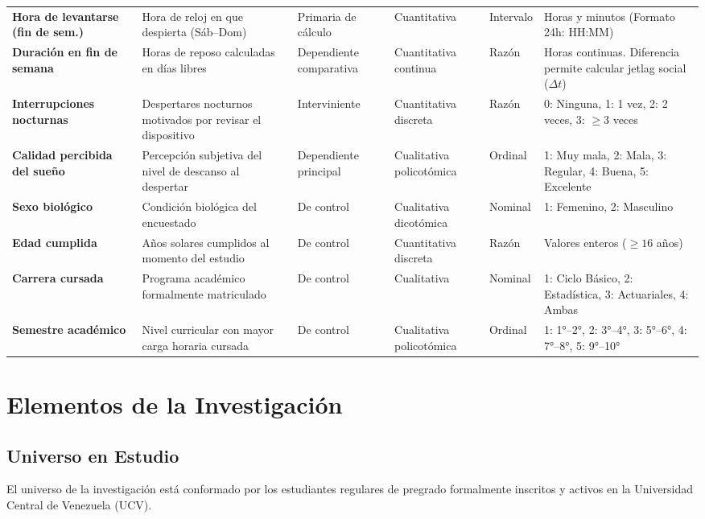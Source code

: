 \documentclass[12pt, letterpaper]{article}
\begin{document}
\begin{table}[H]
\begin{tabularx}{\textwidth}{p{2.8cm}p{3.8cm}lllX}
        \addlinespace
        \textbf{Hora de levantarse (fin de sem.)} & Hora de reloj en que despierta (Sáb--Dom) & Primaria de cálculo & Cuantitativa & Intervalo & Horas y minutos (Formato 24h: HH:MM) \\
        \addlinespace
        \textbf{Duración en fin de semana} & Horas de reposo calculadas en días libres & Dependiente comparativa & Cuantitativa continua & Razón & Horas continuas. Diferencia permite calcular jetlag social ($\Delta t$) \\
        \addlinespace
        \textbf{Interrupciones nocturnas} & Despertares nocturnos motivados por revisar el dispositivo & Interviniente & Cuantitativa discreta & Razón & 0: Ninguna, 1: 1 vez, 2: 2 veces, 3: $\ge 3$ veces \\
        \addlinespace
        \textbf{Calidad percibida del sueño} & Percepción subjetiva del nivel de descanso al despertar & Dependiente principal & Cualitativa policotómica & Ordinal & 1: Muy mala, 2: Mala, 3: Regular, 4: Buena, 5: Excelente \\
        \addlinespace
        \textbf{Sexo biológico} & Condición biológica del encuestado & De control & Cualitativa dicotómica & Nominal & 1: Femenino, 2: Masculino \\
        \addlinespace
        \textbf{Edad cumplida} & Años solares cumplidos al momento del estudio & De control & Cuantitativa discreta & Razón & Valores enteros ($\ge 16$ años) \\
        \addlinespace
        \textbf{Carrera cursada} & Programa académico formalmente matriculado & De control & Cualitativa & Nominal & 1: Ciclo Básico, 2: Estadística, 3: Actuariales, 4: Ambas \\
        \addlinespace
        \textbf{Semestre académico} & Nivel curricular con mayor carga horaria cursada & De control & Cualitativa policotómica & Ordinal & 1: 1°--2°, 2: 3°--4°, 3: 5°--6°, 4: 7°--8°, 5: 9°--10° \\
        \bottomrule
    \end{tabularx}
\end{table}


\section{Elementos de la Investigación}

\subsection{Universo en Estudio}
El universo de la investigación está conformado por los estudiantes regulares de pregrado formalmente inscritos y activos en la Universidad Central de Venezuela (UCV).
\end{document}
